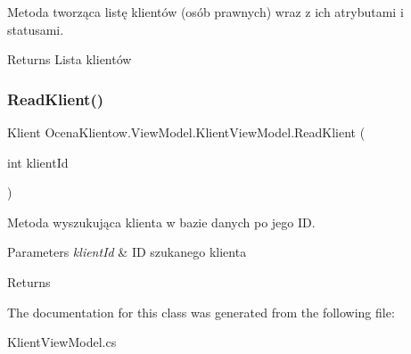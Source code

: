 Metoda tworząca listę klientów (osób prawnych) wraz z ich atrybutami i statusami. 

\begin{DoxyReturn}{Returns}
Lista klientów
\end{DoxyReturn}
\hypertarget{class_ocena_klientow_1_1_view_model_1_1_klient_view_model_a85327fad1eb51fb198a8990f7685ed37}{}\label{class_ocena_klientow_1_1_view_model_1_1_klient_view_model_a85327fad1eb51fb198a8990f7685ed37} 
\subsubsection{\texorpdfstring{Read\+Klient()}{ReadKlient()}}
{\footnotesize\ttfamily Klient Ocena\+Klientow.\+View\+Model.\+Klient\+View\+Model.\+Read\+Klient (\begin{DoxyParamCaption}\item[{int}]{klient\+Id }\end{DoxyParamCaption})\hspace{0.3cm}{\ttfamily [inline]}}



Metoda wyszukująca klienta w bazie danych po jego ID. 


\begin{DoxyParams}{Parameters}
{\em klient\+Id} & ID szukanego klienta\\
\hline
\end{DoxyParams}
\begin{DoxyReturn}{Returns}

\end{DoxyReturn}


The documentation for this class was generated from the following file\+:\begin{DoxyCompactItemize}
\item 
Klient\+View\+Model.\+cs\end{DoxyCompactItemize}
